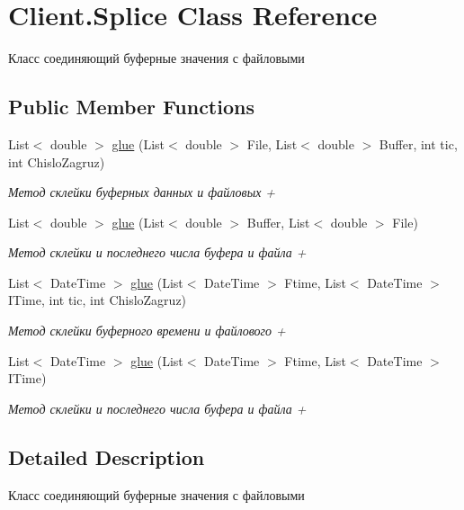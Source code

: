 \hypertarget{class_client_1_1_splice}{}\section{Client.\+Splice Class Reference}
\label{class_client_1_1_splice}


Класс соединяющий буферные значения с файловыми  


\subsection*{Public Member Functions}
\begin{DoxyCompactItemize}
\item 
List$<$ double $>$ \hyperlink{class_client_1_1_splice_a49f90f5d0d645303e1c467300148a02e}{glue} (List$<$ double $>$ File, List$<$ double $>$ Buffer, int tic, int Chislo\+Zagruz)
\begin{DoxyCompactList}\small\item\em Метод склейки буферных данных и файловых + \end{DoxyCompactList}\item 
List$<$ double $>$ \hyperlink{class_client_1_1_splice_a40730137c3ada57dc527824383102584}{glue} (List$<$ double $>$ Buffer, List$<$ double $>$ File)
\begin{DoxyCompactList}\small\item\em Метод склейки и последнего числа буфера и файла + \end{DoxyCompactList}\item 
List$<$ Date\+Time $>$ \hyperlink{class_client_1_1_splice_a061e8b37cd63aef0dbbe951019f7af4f}{glue} (List$<$ Date\+Time $>$ Ftime, List$<$ Date\+Time $>$ I\+Time, int tic, int Chislo\+Zagruz)
\begin{DoxyCompactList}\small\item\em Метод склейки буферного времени и файлового + \end{DoxyCompactList}\item 
List$<$ Date\+Time $>$ \hyperlink{class_client_1_1_splice_adf5f1bc6d5a0060eb8169337217a0a99}{glue} (List$<$ Date\+Time $>$ Ftime, List$<$ Date\+Time $>$ I\+Time)
\begin{DoxyCompactList}\small\item\em Метод склейки и последнего числа буфера и файла + \end{DoxyCompactList}\end{DoxyCompactItemize}


\subsection{Detailed Description}
Класс соединяющий буферные значения с файловыми 



